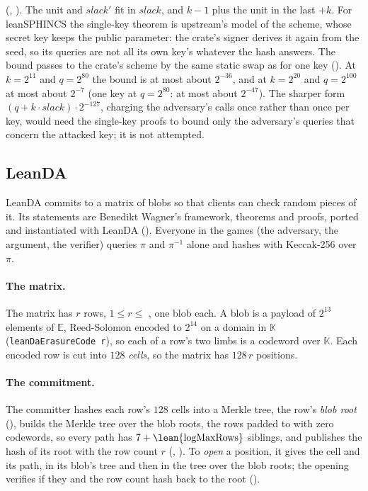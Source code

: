 \documentclass[11pt]{article}
\begin{document}
(, ). The unit and
$\mathit{slack}'$ fit in $\mathit{slack}$, and $k - 1$ plus the unit in the last $+k$. For leanSPHINCS
the single-key theorem is upstream's model of the scheme, whose secret key keeps the public
parameter: the crate's signer derives it again from the seed, so its queries are not all its own
key's whatever the hash answers. The bound passes to the crate's scheme by the same static swap as
for one key (). At $k = 2^{11}$ and $q = 2^{80}$ the bound
is at most about $2^{-36}$, and at $k = 2^{20}$ and $q = 2^{100}$ at most about $2^{-7}$ (one key
at $q = 2^{80}$: at most about $2^{-47}$). The sharper form $(q + k\cdot\mathit{slack})\cdot 2^{-127}$,
charging the adversary's calls once rather than once per key, would need the single-key proofs to
bound only the adversary's queries that concern the attacked key; it is not attempted.

\subsection*{LeanDA}

LeanDA commits to a matrix of blobs so that clients can check random pieces of it. Its statements are
Benedikt Wagner's framework, theorems and proofs, ported and instantiated with LeanDA
(). Everyone in the games (the adversary, the argument, the verifier)
queries $\pi$ and $\pi^{-1}$ alone and hashes with Keccak-256 over $\pi$.

\paragraph{The matrix.} The matrix has $r$ rows, $1 \le r \le$ , one blob each. A blob is a
payload of $2^{13}$ elements of $\mathbb{E}$, Reed-Solomon encoded to $2^{14}$ on a domain in
$\mathbb{K}$ (\texttt{leanDaErasureCode r}), so each of a row's two limbs is a codeword over $\mathbb{K}$. Each encoded row is cut into $128$ \emph{cells}, so the matrix has
$128\,r$ positions.

\paragraph{The commitment.} The committer hashes each row's $128$ cells into a Merkle tree, the
row's \emph{blob root} (), builds the Merkle tree over the blob roots, the rows
padded to  with zero codewords, so every path has $7 + \mbox{\lean{logMaxRows}}$
siblings, and publishes the hash of its root with the row count $r$ (,
). To \emph{open} a position, it gives the cell and its path, in its blob's tree
and then in the tree over the blob roots; the opening verifies if they and the row count hash back
to the root ().
\end{document}
